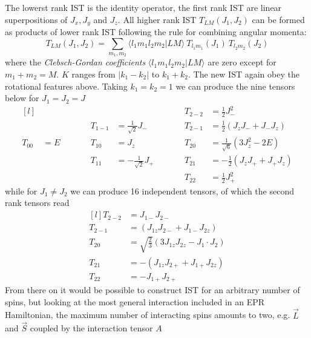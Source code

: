 \documentclass[11.5pt,a4paper]{article}
\begin{document}
The lowerst rank IST is the identity operator, the first rank IST are linear superpositions of $J_x, J_y$ and $J_z$. All higher rank IST $T_{LM} (J_1,J_2)$ can be formed as products of lower rank IST following the rule for combining angular momenta:
\begin{equation}
 T_{LM}(J_1,J_2) = \sum_{m_1,m_2} \langle l_1 m_1 l_2 m_2 | L M \rangle \ T_{l_1 m_1} (J_1) \ T_{l_2 m_2} (J_2)
\end{equation}
where the \emph{Clebsch-Gordan coefficients} $\langle l_1 m_1 l_2 m_2 | L M \rangle$ are zero except for $m_1 + m_2 = M$. $K$ ranges from $|k_1-k_2|$ to $k_1+k_2$. The new IST again obey the rotational features above. Taking $k_1 = k_2 = 1$ we can produce the nine tensors below for $J_1 = J_2 = J$  
\begin{equation}
 \begin{matrix*}[l]
	&	& \quad \quad & &		& \quad \quad     & T_{2 -2}	& = \tfrac{1}{2} J_-^2 \\[1em]
	&	& & T_{1 -1}	& = \tfrac{1}{\sqrt{2}} J_-	& & T_{2 -1}	& = \tfrac{1}{2} ( J_z J_- + J_- J_z) \\[1em]
  T_{0 0}	& = E 	& & T_{1 0}	& = J_z 			& & T_{2 0} 	& = \tfrac{1}{\sqrt{6}} (3J_z^2-2E) \\[1em]
	&	& & T_{1 1}	& = -\tfrac{1}{\sqrt{2}} J_+	& & T_{2 1}	& = - \tfrac{1}{2} ( J_zJ_+ + J_+ J_z)\\[1em]
	&	& &		&				& & T_{2 2}	& = \tfrac{1}{2} J_+^2
 \end{matrix*}
\end{equation}
while for $J_1 \neq J_2$ we can produce 16 independent tensors, of which the second rank tensors read
\begin{equation}
 \begin{matrix*}[l]
	 T_{2 -2}	& = J_{1-} J_{2-} \\[1em]
	 T_{2 -1}	& = ( J_{1z} J_{2-} + J_{1-} J_{2z}) \\[1em]
	 T_{2 0} 	& = \sqrt{\tfrac{2}{3}} (3 J_{1z} J_{2z}-J_1\cdot J_2) \\[1em]
	 T_{2 1}	& =  - ( J_{1z} J_{2+} + J_{1+} J_{2z}) \\[1em]
	 T_{2 2}	& = - J_{1+} J_{2+}
 \end{matrix*}
\end{equation}
From there on it would be possible to construct IST for an arbitrary number of spins, but looking at the most general interaction included in an EPR Hamiltonian, the maximum number of interacting spins amounts to two, e.g. $\vec{L}$ and $\vec{S}$ coupled by the interaction tensor $A$ 
\end{document}
